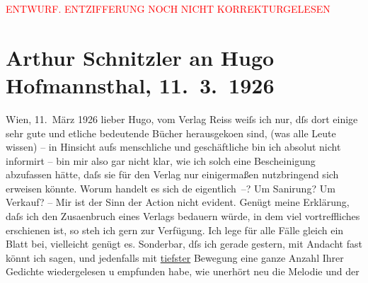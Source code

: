 
\begin{center}
            \textcolor{red}{ENTWURF. ENTZIFFERUNG NOCH NICHT KORREKTURGELESEN}
                      \end{center}
            
               \section[Arthur Schnitzler an Hugo Hofmannsthal, 11. 3. 1926]{ Arthur Schnitzler an Hugo Hofmannsthal, 11. 3. 1926}\nopagebreak{}\rehead{ }\begin{ledgroupsized}[t]{13cm}\normalsize\beginnumbering{} \toendnotes[C]{\smallbreak\pagebreak[2]} 
\pstart
           \raggedleft{}{\pb}Wien, 11. März 1926\pend
           \pstart
           lieber Hugo, vom Verlag Reiss
                    weiſs ich nur, dſs dort einige sehr gute und etliche bedeutende Bücher
                        herausgeko{\geminationm}en sind, (was alle Leute wissen) –
                        \introOben{}in Hinsicht aufs\introOben{} menschliche und geschäftliche bin
                    ich absolut nicht informirt – bin mir also gar nicht klar, wie ich solch eine
                    Bescheinigung abzufassen hätte, daſs sie für den Verlag nur einigermaßen
                    nutzbringend sich erweisen könnte. Worum handelt es sich de{\geminationn} eigentlich –? Um Sanirung? Um Verkauf? – Mir ist
                    der Sinn der Action nicht evident. Genügt meine Erklärung, daſs ich den
                    Zusa{\geminationm}enbruch eines Verlags bedauern würde, in dem viel vortreffliches
                    erschienen ist, so steh ich gern zur Verfügung. Ich lege für alle Fälle gleich
                    ein Blatt bei, vielleicht genügt es.\pend
           \pstart
           {\pb}Sonderbar, dſs ich gerade gestern, mit Andacht
                    fast könnt ich sagen, und jedenfalls mit \uline{tiefster} Bewegung eine ganze Anzahl Ihrer Gedichte \introOben{}wieder\introOben{}gelesen u empfunden habe, wie unerhört neu die Melodie und der

\end{ledgroupsized}
